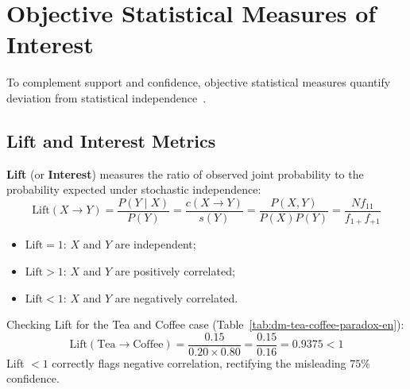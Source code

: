 \section{Objective Statistical Measures of Interest}
\label{sec:dm-interest-measures}

To complement support and confidence, objective statistical measures quantify deviation from statistical independence~\cite{tan2018, piatetsky1991}.

\subsection{Lift and Interest Metrics}
\textbf{Lift} (or \textbf{Interest}) measures the ratio of observed joint probability to the probability expected under stochastic independence:
\begin{equation}
\label{eq:dm-lift-definition-en}
\mathrm{Lift}(X \longrightarrow Y) = \frac{P(Y \mid X)}{P(Y)} = \frac{c(X \longrightarrow Y)}{s(Y)} = \frac{P(X, Y)}{P(X)P(Y)} = \frac{N f_{11}}{f_{1+} f_{+1}}
\end{equation}

\begin{itemize}
    \item $\mathrm{Lift} = 1$: $X$ and $Y$ are independent;
    \item $\mathrm{Lift} > 1$: $X$ and $Y$ are positively correlated;
    \item $\mathrm{Lift} < 1$: $X$ and $Y$ are negatively correlated.
\end{itemize}

Checking Lift for the Tea and Coffee case (Table~\ref{tab:dm-tea-coffee-paradox-en}):
\begin{equation}
\mathrm{Lift}(\text{Tea} \longrightarrow \text{Coffee}) = \frac{0.15}{0.20 \times 0.80} = \frac{0.15}{0.16} = 0.9375 < 1
\end{equation}
Lift $< 1$ correctly flags negative correlation, rectifying the misleading $75\%$ confidence.

